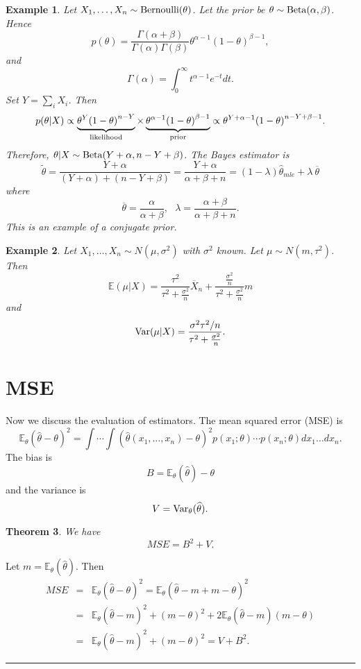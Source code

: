 \documentclass[twoside,12pt]{article}
\newcounter{lecnum}
\newtheorem{theorem}{Theorem}[lecnum]
\newtheorem{example}[theorem]{Example}
\newenvironment{proof}{{\bf Proof:}}{\hfill\rule{2mm}{2mm}}
\newcommand\E{\mathbb{E}}
\begin{document}
\begin{example}
Let $X_1,\ldots, X_n \sim {\rm Bernoulli}(\theta)$.
Let the prior be
$\theta\sim {\rm Beta}(\alpha,\beta)$.
Hence
$$
p(\theta) = \frac{\Gamma(\alpha + \beta)}{\Gamma(\alpha )\Gamma(\beta)} \theta^{\alpha -1 }(1- \theta)^{\beta -1 },
$$
and
$$
\Gamma(\alpha) = \int_0^\infty t^{\alpha-1}e^{-t} dt.
$$
Set $Y=\sum_i X_i$. Then
$$
p(\theta|X)\propto \underbrace{\theta^{Y}{(1-\theta)}^{n-Y}}_{\rm likelihood}\times
\underbrace{\theta^{\alpha-1}{(1-\theta)}^{\beta-1}}_{\rm prior} \propto
\theta^{Y+\alpha-1}{(1-\theta)}^{n-Y+\beta-1}.
$$
Therefore,
$\theta|X \sim {\rm Beta}(Y+\alpha,n-Y+\beta)$.
The Bayes estimator is
$$
\widetilde{\theta} = \frac{Y+\alpha}{(Y+\alpha)+(n-Y+\beta)} = 
\frac{Y+\alpha}{\alpha+\beta+n} = (1-\lambda) \widehat{\theta}_{mle} + \lambda \ \overline{\theta}
$$
where
$$
\overline{\theta}=\frac{\alpha}{\alpha+\beta},\ \ \ 
\lambda = \frac{\alpha+\beta}{\alpha+\beta+n}.
$$
This is an example of a {\em conjugate prior.}
\end{example}



\begin{example}
Let $X_1,\ldots, X_n \sim N(\mu,\sigma^2)$ with
$\sigma^2$ known.
Let
$\mu\sim N(m,\tau^2)$.
Then
$$
\mathbb{E}(\mu|X) = \frac{\tau^2}{\tau^2 + \frac{\sigma^2}{n}}\overline{X}_n +
 \frac{\frac{\sigma^2}{n}}{\tau^2 + \frac{\sigma^2}{n}}m
$$
and
$$
{\rm Var}(\mu|X) = \frac{\sigma^2\tau^2/n}{\tau^2 + \frac{\sigma^2}{n}}.
$$
\end{example}



\section{MSE}

Now we discuss the evaluation of estimators.
The mean squared error (MSE) is
$$
\E_\theta( \widehat\theta - \theta)^2 =
\int \cdots \int
( \widehat\theta(x_1,\ldots, x_n) - \theta)^2  p(x_1;\theta) \cdots p(x_n;\theta) dx_1 \ldots dx_n.
$$
The bias is
$$
B = \E_\theta( \widehat\theta) - \theta
$$
and the variance is
$$
V = {\rm Var}_\theta (\widehat\theta).
$$

\begin{theorem}
We have
$$
MSE = B^2 + V.
$$
\end{theorem}

\begin{proof}
Let $m = \E_\theta (\widehat\theta)$.
Then
\begin{eqnarray*}
MSE &=& \E_\theta( \widehat\theta - \theta)^2 = 
\E_\theta( \widehat\theta - m+m-\theta)^2\\
&=& \E_\theta( \widehat\theta - m)^2 + (m-\theta)^2 +
2 \E_\theta( \widehat\theta - m) (m-\theta) \\
&=& \E_\theta( \widehat\theta - m)^2 + (m-\theta)^2 = V + B^2.
\end{eqnarray*}
\end{proof}
\end{document}

